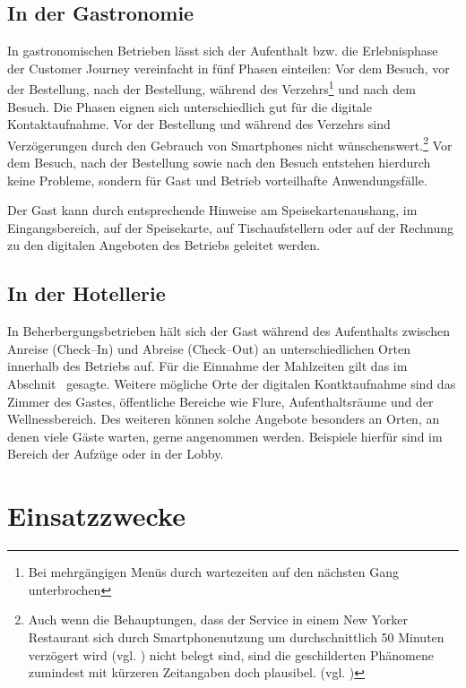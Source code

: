 \subsection{In der Gastronomie} %
\label{sub:gastronomie}
In gastronomischen Betrieben lässt sich der Aufenthalt bzw. die Erlebnisphase der Customer Journey vereinfacht in fünf Phasen einteilen: Vor dem Besuch, vor der Bestellung, nach der Bestellung, während des Verzehrs\footnote{Bei mehrgängigen Menüs durch wartezeiten auf den nächsten Gang unterbrochen} und nach dem Besuch. Die Phasen eignen sich unterschiedlich gut für die digitale Kontaktaufnahme.  Vor der Bestellung und während des Verzehrs sind Verzögerungen durch den Gebrauch von Smartphones nicht wünschenswert.\footnote{Auch wenn die Behauptungen, dass der Service in einem New Yorker Restaurant sich durch Smartphonenutzung um durchschnittlich 50 Minuten verzögert wird (vgl. \cite{craiglist:slow}) nicht belegt sind, sind die geschilderten Phänomene zumindest mit kürzeren Zeitangaben doch plausibel. (vgl. \cite{craiglist:fake})} Vor dem Besuch, nach der Bestellung sowie nach den Besuch entstehen hierdurch keine Probleme, sondern für Gast und Betrieb vorteilhafte Anwendungsfälle. 

Der Gast kann durch entsprechende Hinweise am Speisekartenaushang, im Eingangsbereich, auf der Speisekarte, auf Tischaufstellern oder auf der Rechnung zu den digitalen Angeboten des Betriebs geleitet werden.

\subsection{In der Hotellerie} %
\label{sub:hotellerie}
In Beherbergungsbetrieben hält sich der Gast während des Aufenthalts zwischen Anreise (Check–In) und Abreise (Check–Out) an unterschiedlichen Orten innerhalb des Betriebs auf. Für die Einnahme der Mahlzeiten gilt das im Abschnit~ gesagte. Weitere mögliche Orte der digitalen Kontktaufnahme sind das Zimmer des Gastes, öffentliche Bereiche wie Flure, Aufenthaltsräume und der Wellnessbereich. Des weiteren können solche Angebote besonders an Orten, an denen viele Gäste warten, gerne angenommen werden. Beispiele hierfür sind im Bereich der Aufzüge oder in der Lobby.




\newpage
\section{Einsatzzwecke} %
\label{sec:einsatzzwecke}

